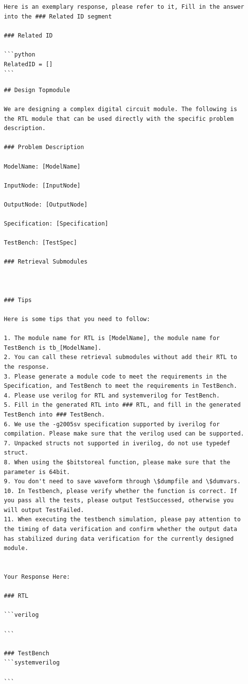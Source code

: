\documentclass[UTF8]{ctexart}
\begin{document}
\begin{lstlisting}[frame=shadowbox,caption=Match\_Submodule.md]
Here is an exemplary response, please refer to it, Fill in the answer into the ### Related ID segment

### Related ID

```python
RelatedID = []
```

\end{lstlisting}


\begin{lstlisting}[frame=shadowbox,caption=Design\_Topmodule.md]
## Design Topmodule

We are designing a complex digital circuit module. The following is the RTL module that can be used directly with the specific problem description.

### Problem Description

ModelName: [ModelName]

InputNode: [InputNode]

OutputNode: [OutputNode]

Specification: [Specification]

TestBench: [TestSpec]

### Retrieval Submodules



### Tips

Here is some tips that you need to follow:

1. The module name for RTL is [ModelName], the module name for TestBench is tb_[ModelName].
2. You can call these retrieval submodules without add their RTL to the response.
3. Please generate a module code to meet the requirements in the Specification, and TestBench to meet the requirements in TestBench.
4. Please use verilog for RTL and systemverilog for TestBench.
5. Fill in the generated RTL into ### RTL, and fill in the generated TestBench into ### TestBench.
6. We use the -g2005sv specification supported by iverilog for compilation. Please make sure that the verilog used can be supported.
7. Unpacked structs not supported in iverilog, do not use typedef struct.
8. When using the $bitstoreal function, please make sure that the parameter is 64bit.
9. You don't need to save waveform through \$dumpfile and \$dumvars.
10. In Testbench, please verify whether the function is correct. If you pass all the tests, please output TestSuccessed, otherwise you will output TestFailed.
11. When executing the testbench simulation, please pay attention to the timing of data verification and confirm whether the output data has stabilized during data verification for the currently designed module. 


Your Response Here:

### RTL

```verilog

```

### TestBench
```systemverilog

```
\end{lstlisting}
\end{document}

